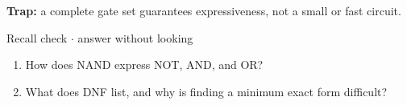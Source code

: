 \documentclass[11pt]{article}
\begin{document}
\begin{keepsection}
\begin{keepsection}
\begin{notebox}\textbf{Trap:} a complete gate set guarantees expressiveness, not a small or fast circuit.\end{notebox}

\begin{recallbox}{Recall check \ensuremath{\cdot} answer without looking}
\begin{enumerate}
\item How does NAND express NOT, AND, and OR?
\item What does DNF list, and why is finding a minimum exact form difficult?
\end{enumerate}

\end{recallbox}
\end{keepsection}
\end{keepsection}
\end{document}
